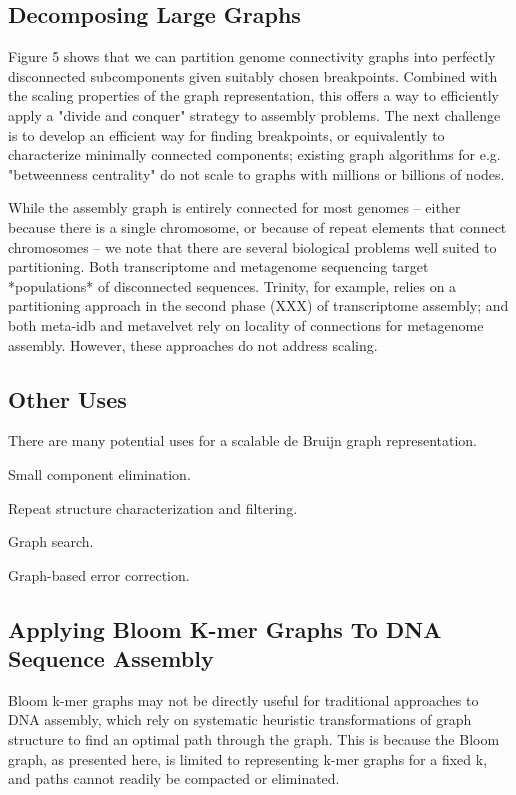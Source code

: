 \documentclass[12pt]{article} \usepackage{simplemargins}
\begin{document}
\subsection{Decomposing Large Graphs}
Figure 5 shows that we can partition
genome connectivity graphs into perfectly disconnected subcomponents
given suitably chosen breakpoints.  Combined with the scaling
properties of the graph representation, this offers a way to
efficiently apply a "divide and conquer" strategy to assembly
problems.  The next challenge is to develop an efficient way for
finding breakpoints, or equivalently to characterize minimally
connected components; existing graph algorithms for e.g. "betweenness
centrality" do not scale to graphs with millions or billions of nodes.

While the assembly graph is entirely connected for most genomes --
either because there is a single chromosome, or because of repeat
elements that connect chromosomes -- we note that there are several
biological problems well suited to partitioning.  Both transcriptome
and metagenome sequencing target *populations* of disconnected
sequences.  Trinity, for example, relies on a partitioning approach in
the second phase (XXX) of transcriptome assembly; and both meta-idb
and metavelvet rely on locality of connections for metagenome
assembly.  However, these approaches do not address scaling.

\subsection{Other Uses}

There are many potential uses for a scalable de Bruijn graph representation.

Small component elimination.

Repeat structure characterization and filtering.

Graph search.

Graph-based error correction.

\subsection{Applying Bloom K-mer Graphs To DNA Sequence Assembly}
Bloom k-mer graphs may not be directly useful for traditional
approaches to DNA assembly, which rely on systematic heuristic
transformations of graph structure to find an optimal path through the
graph.  This is because the Bloom graph, as presented here, is limited
to representing k-mer graphs for a fixed k, and paths cannot readily
be compacted or eliminated.
\end{document}
